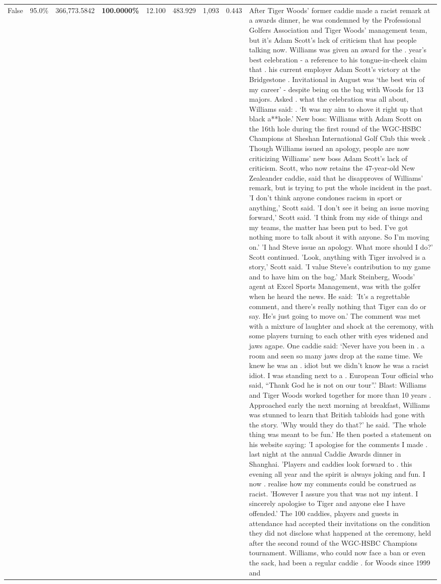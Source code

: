 \begin{table}[H]
\begin{tabular}{lllrlllll}
False & 95.0\% & 366,773.5842 & \bfseries \color{red} 100.0000\% & 12.100 & 483.929 & 1,093 & 0.443 & After Tiger Woods' former caddie made a racist remark at a awards dinner, he was condemned by the Professional Golfers Association and Tiger Woods' management team, but it's Adam Scott's lack of criticism that has people talking now. Williams was given an award for the . year’s best celebration - a reference to his tongue-in-cheek claim that . his current employer Adam Scott’s victory at the Bridgestone . Invitational in August was ‘the best win of my career’ - despite being on the bag with Woods for 13 majors. Asked . what the celebration was all about, Williams said: . ‘It was my aim to shove it right up that black a**hole.’ New boss: Williams with Adam Scott  on the 16th hole during the first round of the WGC-HSBC Champions at Sheshan International Golf Club this week . Though Williams issued an apology, people are now criticizing Williams' new boss Adam Scott's lack of criticism. Scott, who now retains the 47-year-old New Zealeander caddie, said that he disapproves of Williams' remark, but is trying to put the whole incident in the past. 'I don't think anyone condones racism in sport or anything,' Scott said. 'I don't see it being an issue moving forward,' Scott said. 'I think from my side of things and my teams, the matter has been put to bed. I've got nothing more to talk about it with anyone. So I'm moving on.' 'I had Steve issue an apology. What more should I do?' Scott continued. 'Look, anything with Tiger involved is a story,' Scott said. 'I value Steve's contribution to my game and to have him on the bag.' Mark Steinberg, Woods' agent at Excel Sports Management, was with the golfer when he heard the news. He said: 'It's a regrettable comment, and there's really nothing that Tiger can do or say. He's just going to move on.' The comment was met with a mixture of laughter and shock at the ceremony, with some players turning to each other with eyes widened and jaws agape. One caddie said: ‘Never have you been in . a room and seen so many jaws drop at the same time. We knew he was an . idiot but we didn’t know he was a racist idiot. I was standing next to a . European Tour official who said, “Thank God he is not on our tour”.’ Blast: Williams and Tiger Woods worked together for more than 10 years . Approached early the next morning at breakfast, Williams was stunned to learn that British tabloids had gone with the story. 'Why would they do that?' he said. 'The whole thing was meant to be fun.' He then posted a statement on his website saying: 'I apologise for the comments I made . last night at the annual Caddie Awards dinner in Shanghai. 'Players and caddies look forward to . this evening all year and the spirit is always joking and fun. I now . realise how my comments could be construed as racist. 'However I assure you that was not my intent. I sincerely apologise to Tiger and anyone else I have offended.' The 100 caddies, players and guests in attendance had accepted their invitations on the condition they did not disclose what happened at the ceremony, held after the second round of the WGC-HSBC Champions tournament. Williams, who could now face a ban or even the sack, had been a regular caddie . for Woods since 1999 and 
\end{tabular}
\end{table}
